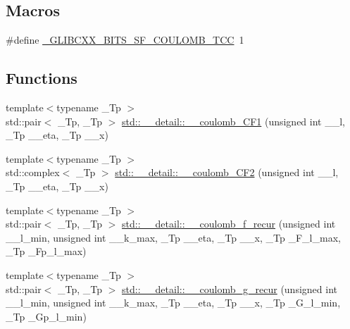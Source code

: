 \subsection*{Macros}
\begin{DoxyCompactItemize}
\item 
\#define \hyperlink{sf__coulomb_8tcc_a162e29800b43ed4d5f024cda4a7a6531}{\+\_\+\+G\+L\+I\+B\+C\+X\+X\+\_\+\+B\+I\+T\+S\+\_\+\+S\+F\+\_\+\+C\+O\+U\+L\+O\+M\+B\+\_\+\+T\+CC}~1
\end{DoxyCompactItemize}
\subsection*{Functions}
\begin{DoxyCompactItemize}
\item 
{\footnotesize template$<$typename \+\_\+\+Tp $>$ }\\std\+::pair$<$ \+\_\+\+Tp, \+\_\+\+Tp $>$ \hyperlink{namespacestd_1_1____detail_a0737f268d024ed5d66d3e926239a5c49}{std\+::\+\_\+\+\_\+detail\+::\+\_\+\+\_\+coulomb\+\_\+\+C\+F1} (unsigned int \+\_\+\+\_\+l, \+\_\+\+Tp \+\_\+\+\_\+eta, \+\_\+\+Tp \+\_\+\+\_\+x)
\item 
{\footnotesize template$<$typename \+\_\+\+Tp $>$ }\\std\+::complex$<$ \+\_\+\+Tp $>$ \hyperlink{namespacestd_1_1____detail_a400332397b6d529764b61bdd7726f75c}{std\+::\+\_\+\+\_\+detail\+::\+\_\+\+\_\+coulomb\+\_\+\+C\+F2} (unsigned int \+\_\+\+\_\+l, \+\_\+\+Tp \+\_\+\+\_\+eta, \+\_\+\+Tp \+\_\+\+\_\+x)
\item 
{\footnotesize template$<$typename \+\_\+\+Tp $>$ }\\std\+::pair$<$ \+\_\+\+Tp, \+\_\+\+Tp $>$ \hyperlink{namespacestd_1_1____detail_ab6a730206fba9db024f3c1c26fe6a954}{std\+::\+\_\+\+\_\+detail\+::\+\_\+\+\_\+coulomb\+\_\+f\+\_\+recur} (unsigned int \+\_\+\+\_\+l\+\_\+min, unsigned int \+\_\+\+\_\+k\+\_\+max, \+\_\+\+Tp \+\_\+\+\_\+eta, \+\_\+\+Tp \+\_\+\+\_\+x, \+\_\+\+Tp \+\_\+\+F\+\_\+l\+\_\+max, \+\_\+\+Tp \+\_\+\+Fp\+\_\+l\+\_\+max)
\item 
{\footnotesize template$<$typename \+\_\+\+Tp $>$ }\\std\+::pair$<$ \+\_\+\+Tp, \+\_\+\+Tp $>$ \hyperlink{namespacestd_1_1____detail_ad3bcd9e0587db5699088065900382e8b}{std\+::\+\_\+\+\_\+detail\+::\+\_\+\+\_\+coulomb\+\_\+g\+\_\+recur} (unsigned int \+\_\+\+\_\+l\+\_\+min, unsigned int \+\_\+\+\_\+k\+\_\+max, \+\_\+\+Tp \+\_\+\+\_\+eta, \+\_\+\+Tp \+\_\+\+\_\+x, \+\_\+\+Tp \+\_\+\+G\+\_\+l\+\_\+min, \+\_\+\+Tp \+\_\+\+Gp\+\_\+l\+\_\+min)

\end{DoxyCompactItemize}
